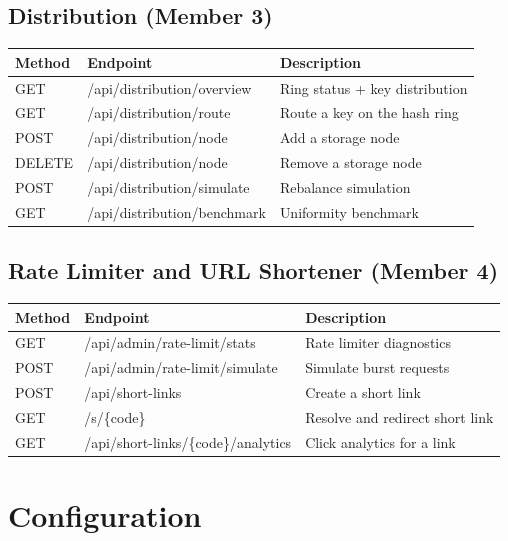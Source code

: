 \documentclass[12pt,a4paper]{report}
\begin{document}
\section{Distribution (Member 3)}
\begin{table}[H]
\centering
\begin{tabularx}{\textwidth}{l l X}
\toprule
\textbf{Method} & \textbf{Endpoint} & \textbf{Description} \\
\midrule
GET & /api/distribution/overview & Ring status + key distribution \\
GET & /api/distribution/route & Route a key on the hash ring \\
POST & /api/distribution/node & Add a storage node \\
DELETE & /api/distribution/node & Remove a storage node \\
POST & /api/distribution/simulate & Rebalance simulation \\
GET & /api/distribution/benchmark & Uniformity benchmark \\
\bottomrule
\end{tabularx}
\end{table}

\section{Rate Limiter and URL Shortener (Member 4)}
\begin{table}[H]
\centering
\begin{tabularx}{\textwidth}{l l X}
\toprule
\textbf{Method} & \textbf{Endpoint} & \textbf{Description} \\
\midrule
GET & /api/admin/rate-limit/stats & Rate limiter diagnostics \\
POST & /api/admin/rate-limit/simulate & Simulate burst requests \\
POST & /api/short-links & Create a short link \\
GET & /s/\{code\} & Resolve and redirect short link \\
GET & /api/short-links/\{code\}/analytics & Click analytics for a link \\
\bottomrule
\end{tabularx}
\end{table}


\chapter{Configuration}
\end{document}
